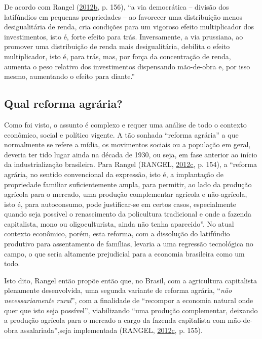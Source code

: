 \documentclass[a4paper, 12pt]{article}
\begin{document}
De acordo com Rangel
(\protect\hyperlink{ref-rangel1988}{2012}\protect\hyperlink{ref-rangel1988}{b},
p. 156), ``a via democrática -- divisão dos latifúndios em pequenas
propriedades -- ao favorecer uma distribuição menos desigualitária de
renda, cria condições para um vigoroso efeito multiplicador dos
investimentos, isto é, forte efeito para trás. Inversamente, a via
prussiana, ao promover uma distribuição de renda mais desigualitária,
debilita o efeito multiplicador, isto é, para trás, mas, por força da
concentração de renda, aumenta o peso relativo dos investimentos
dispensando mão-de-obra e, por isso mesmo, aumentando o efeito para
diante.''

\hypertarget{qual-reforma-agraria}{%
\subsection{Qual reforma agrária?}\label{qual-reforma-agraria}}

Como foi visto, o assunto é complexo e requer uma análise de todo o
contexto econômico, social e político vigente. A tão sonhada ``reforma
agrária'' a que normalmente se refere a mídia, os movimentos sociais ou
a população em geral, deveria ter tido lugar ainda na década de 1930, ou
seja, em fase anterior ao início da industrialização brasileira. Para
Rangel (RANGEL,
\protect\hyperlink{ref-rangel1986a}{2012}\protect\hyperlink{ref-rangel1986a}{c},
p. 154), a ``reforma agrária, no sentido convencional da expressão, isto
é, a implantação de propriedade familiar suficientemente ampla, para
permitir, ao lado da produção agrícola para o mercado, uma produção
complementar agrícola e não-agrícola, isto é, para autoconsumo, pode
justificar-se em certos casos, especialmente quando seja possível o
renascimento da policultura tradicional e onde a fazenda capitalista,
mono ou oligoculturista, ainda não tenha aparecido''. No atual contexto
econômico, porém, esta reforma, com a dissolução do latifúndio produtivo
para assentamento de famílias, levaria a uma regressão tecnológica no
campo, o que seria altamente prejudicial para a economia brasileira como
um todo.

Isto dito, Rangel então propõe então que, no Brasil, com a agricultura
capitalista plenamente desenvolvida, uma segunda variante de reforma
agrária, ``\emph{não necessariamente rural}'', com a finalidade de
``recompor a economia natural onde quer que isto seja possível'',
viabilizando ``uma produção complementar, deixando a produção agrícola
para o mercado a cargo da fazenda capitalista com mão-de-obra
assalariada'',seja implementada (RANGEL,
\protect\hyperlink{ref-rangel1986a}{2012}\protect\hyperlink{ref-rangel1986a}{c},
p. 155).
\end{document}
